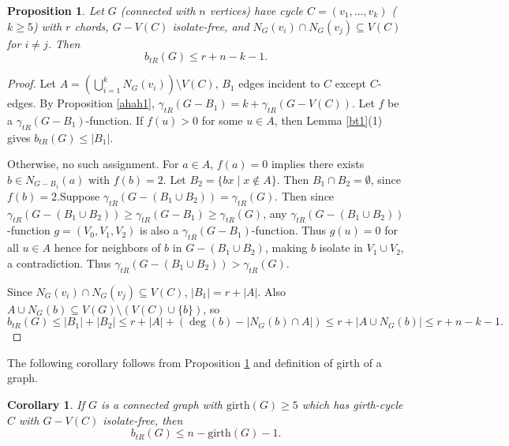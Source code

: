 \documentclass[12pt,reqno]{amsart}
\theoremstyle{plain}
\newtheorem{corollary}[theorem]{Corollary}
\newtheorem{proposition}[theorem]{Proposition}
\numberwithin{equation}{section}
\begin{document}
\begin{proposition}\label{Pro21}
Let $G$ (connected with $n$ vertices) have cycle $C = (v_1, \dots, v_k)$ ($k \geq 5$) with $r$ chords, $G - V(C)$ isolate-free, and $N_G(v_i) \cap N_G(v_j) \subseteq V(C)$ for $i \neq j$. Then $$b_{tR}(G) \leq r + n - k - 1.$$
\end{proposition}

\begin{proof}
Let $A = (\bigcup_{i=1}^k N_G(v_i)) \setminus V(C)$, $B_1$ edges incident to $C$ except $C$-edges. By Proposition \ref{ahah1}, $\gamma_{tR}(G - B_1) = k + \gamma_{tR}(G - V(C))$. Let $f$ be a $\gamma_{tR}(G - B_1)$-function. If $f(u) > 0$ for some $u \in A$, then Lemma \ref{bt1}(1) gives $b_{tR}(G) \leq |B_1|$.

Otherwise, no such assignment. For $a \in A$, $f(a) = 0$ implies there exists $b \in N_{G - B_1}(a)$ with $f(b) = 2$. Let $B_2 = \{bx \mid x \notin A\}$. Then $B_1 \cap B_2 = \emptyset$, since $f(b)=2$.Suppose $\gamma_{tR}(G - (B_1 \cup B_2)) = \gamma_{tR}(G)$. Then since $\gamma_{tR}(G-(B_1\cup B_2))\geq \gamma_{tR}(G-B_1)\geq \gamma_{tR}(G)$,  any $\gamma_{tR}(G-(B_1\cup B_2))$-function $g=(V_0, V_1, V_2)$ is also a $\gamma_{tR}(G-B_1)$-function. Thus $g(u)=0$ for all $u\in A$ hence for neighbors of $b$ in $G-(B_1\cup B_2)$, making $b$ isolate in $V_1 \cup V_2$, a contradiction. Thus $\gamma_{tR}(G - (B_1 \cup B_2)) > \gamma_{tR}(G)$.

Since $N_G(v_i) \cap N_G(v_j) \subseteq V(C)$, $|B_1| = r + |A|$. Also $A \cup N_G(b) \subseteq V(G) \setminus (V(C) \cup \{b\})$, so
$$b_{tR}(G) \leq |B_1| + |B_2| \leq r + |A| + (\deg(b) - |N_G(b) \cap A|) \leq r + |A \cup N_G(b)| \leq r + n - k - 1.$$
\end{proof}

The following corollary follows from Proposition \ref{Pro21} and definition of girth of a graph.
\begin{corollary}
If $G$ is a connected graph with $\mathrm{girth}(G) \geq 5$ which has girth-cycle $C$ with $G - V(C)$ isolate-free, then 
$$b_{tR}(G) \leq n - \mathrm{girth}(G) - 1.$$
\end{corollary}
\end{document}
